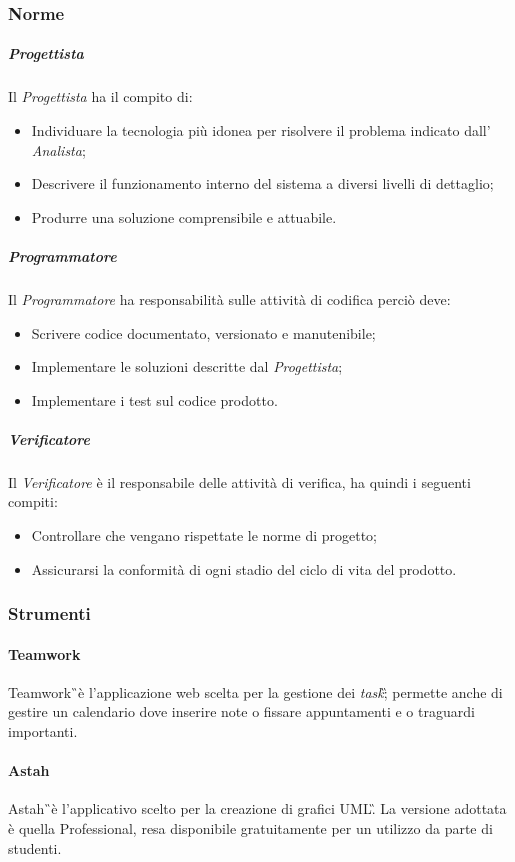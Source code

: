 \subsubsection{Norme}

\subparagraph{Progettista} Il \textit{Progettista} ha il compito di:
\begin{itemize}
\item Individuare la tecnologia più idonea per risolvere il problema indicato dall' \textit{Analista};
\item Descrivere il funzionamento interno del sistema a diversi livelli di dettaglio;
\item Produrre una soluzione comprensibile e attuabile. 
\end{itemize}

\subparagraph{Programmatore} Il \textit{Programmatore} ha responsabilità sulle attività di codifica perciò deve:
\begin{itemize}
\item Scrivere codice documentato, versionato e manutenibile;
\item Implementare le soluzioni descritte dal \textit{Progettista};
\item Implementare i test sul codice prodotto. 
\end{itemize}

\subparagraph{Verificatore} Il \textit{Verificatore} è il responsabile delle attività di verifica, ha quindi i seguenti compiti:
\begin{itemize}
\item Controllare che vengano rispettate le norme di progetto;
\item Assicurarsi la conformità di ogni stadio del ciclo di vita del prodotto.
\end{itemize}

\subsubsection{Strumenti}

\paragraph{Teamwork} Teamwork\G\ è l'applicazione web scelta per la gestione dei \textit{task}\G; permette anche di gestire un calendario dove inserire note o fissare appuntamenti e o traguardi importanti.
\paragraph{Astah} Astah\G\ è l’applicativo scelto per la creazione di grafici UML\G. La versione adottata è quella Professional, resa disponibile gratuitamente per un utilizzo da parte di studenti.
